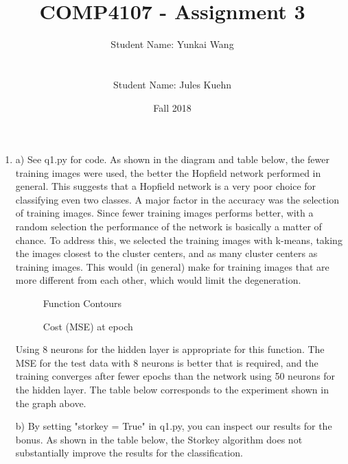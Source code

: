 \documentclass[11pt]{article}
\title{COMP4107 - Assignment 3}
\author{Student Name: Yunkai Wang\\
\text{Student Number: 100968473}\\\\
Student Name: Jules Kuehn\\
\text{Student Number: 100661464}}
\date{Fall 2018}
\begin{document}
\maketitle
\begin{enumerate}

\item
a) See q1.py for code.\newline
\newline
As shown in the diagram and table below, the fewer training images were used, the better the Hopfield network performed in general. This suggests that a Hopfield network is a very poor choice for classifying even two classes.\newline
A major factor in the accuracy was the selection of training images. Since fewer training images performs better, with a random selection the performance of the network is basically a matter of chance. To address this, we selected the training images with k-means, taking the images closest to the cluster centers, and as many cluster centers as training images. This would (in general) make for training images that are more different from each other, which would limit the degeneration.
\begin{figure}[h!]
    \centering
    \begin{minipage}{0.45\textwidth}
        \centering
        \caption{Function Contours}
    \end{minipage}\hfill
    \begin{minipage}{0.45\textwidth}
        \centering
        \caption{Cost (MSE) at epoch}
    \end{minipage}
\end{figure}\newline
Using 8 neurons for the hidden layer is appropriate for this function. The MSE for the test data with 8 neurons is better that is required, and the training converges after fewer epochs than the network using 50 neurons for the hidden layer.\newline
The table below corresponds to the experiment shown in the graph above.\newline
%


b) By setting "storkey = True" in q1.py, you can inspect our results for the bonus.\newline
\newline
As shown in the table below, the Storkey algorithm does not substantially improve the results for the classification.


\end{enumerate}
\end{document}
